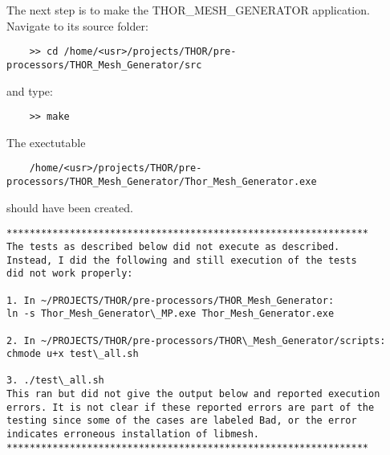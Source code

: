 The next step is to make the THOR\_MESH\_GENERATOR application. Navigate to its source folder:
\begin{verbatim}
    >> cd /home/<usr>/projects/THOR/pre-processors/THOR_Mesh_Generator/src
\end{verbatim}
and type:
\begin{verbatim}
    >> make
\end{verbatim}
The exectutable
\begin{verbatim}
    /home/<usr>/projects/THOR/pre-processors/THOR_Mesh_Generator/Thor_Mesh_Generator.exe
\end{verbatim}
should have been created.

\begin{verbatim}
***************************************************************
The tests as described below did not execute as described.
Instead, I did the following and still execution of the tests
did not work properly:

1. In ~/PROJECTS/THOR/pre-processors/THOR_Mesh_Generator:
ln -s Thor_Mesh_Generator\_MP.exe Thor_Mesh_Generator.exe

2. In ~/PROJECTS/THOR/pre-processors/THOR\_Mesh_Generator/scripts:
chmode u+x test\_all.sh

3. ./test\_all.sh
This ran but did not give the output below and reported execution
errors. It is not clear if these reported errors are part of the
testing since some of the cases are labeled Bad, or the error
indicates erroneous installation of libmesh.
***************************************************************
\end{verbatim}


